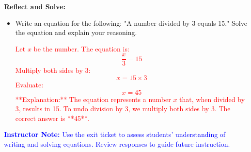 \documentclass[12pt]{article}
\begin{document}
\begin{tcolorbox}[colframe=black!60, colback=white, 
coltitle=black, colbacktitle=black!15, fonttitle=\bfseries\Large, 
title=Exit Ticket, halign title=center, left=10pt, right=10pt, top=10pt, bottom=15pt]
\textbf{Reflect and Solve:}
\begin{itemize}
    \item Write an equation for the following: "A number divided by 3 equals 15." Solve the equation and explain your reasoning.

    \textcolor{red}{
    Let \( x \) be the number. The equation is:
    \[
    \frac{x}{3} = 15
    \]
    Multiply both sides by 3:
    \[
    x = 15 \times 3
    \]
    Evaluate:
    \[
    x = 45
    \]
    **Explanation:** The equation represents a number \( x \) that, when divided by 3, results in 15. To undo division by 3, we multiply both sides by 3. The correct answer is **45**.
    }
\end{itemize}

\textcolor{blue}{\textbf{Instructor Note:} Use the exit ticket to assess students' understanding of writing and solving equations. Review responses to guide future instruction.}
\end{tcolorbox}
\end{document}
